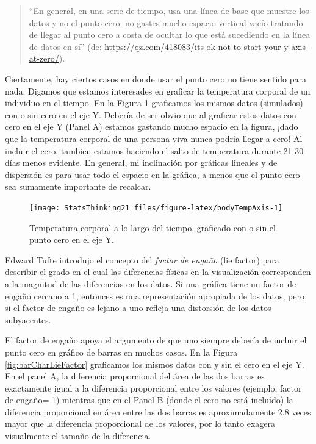 \documentclass[
  12pt,
]{book}
\begin{document}
\begin{quote}
``En general, en una serie de tiempo, usa una línea de base que muestre los datos y no el punto cero; no gastes mucho espacio vertical vacío tratando de llegar al punto cero a costa de ocultar lo que está sucediendo en la línea de datos en sí'' (de: \url{https://qz.com/418083/its-ok-not-to-start-your-y-axis-at-zero/}).
\end{quote}

Ciertamente, hay ciertos casos en donde usar el punto cero no tiene sentido para nada. Digamos que estamos interesades en graficar la temperatura corporal de un individuo en el tiempo. En la Figura \ref{fig:bodyTempAxis} graficamos los mismos datos (simulados) con o sin cero en el eje Y. Debería de ser obvio que al graficar estos datos con cero en el eje Y (Panel A) estamos gastando mucho espacio en la figura, ¡dado que la temperatura corporal de una persona viva nunca podría llegar a cero! Al incluir el cero, tambien estamos haciendo el salto de temperatura durante 21-30 días menos evidente. En general, mi inclinación por gráficas lineales y de dispersión es para usar todo el espacio en la gráfica, a menos que el punto cero sea sumamente importante de recalcar.

\begin{figure}
\texttt{[image: StatsThinking21\_files/figure-latex/bodyTempAxis-1]} \caption{Temperatura corporal a lo largo del tiempo, graficado con o sin el punto cero en el eje Y.}\label{fig:bodyTempAxis}
\end{figure}

Edward Tufte introdujo el concepto del \emph{factor de engaño} (lie factor) para describir el grado en el cual las diferencias físicas en la visualización corresponden a la magnitud de las diferencias en los datos. Si una gráfica tiene un factor de engaño cercano a 1, entonces es una representación apropiada de los datos, pero si el factor de engaño es lejano a uno refleja una distorsión de los datos subyacentes.

El factor de engaño apoya el argumento de que uno siempre debería de incluir el punto cero en gráfico de barras en muchos casos. En la Figura \ref{fig:barCharLieFactor} graficamos los mismos datos con y sin el cero en el eje Y. En el panel A, la diferencia proporcional del área de las dos barras es exactamente igual a la diferencia proporcional entre los valores (ejemplo, factor de engaño= 1) mientras que en el Panel B (donde el cero no está incluído) la diferencia proporcional en área entre las dos barras es aproximadamente 2.8 veces mayor que la diferencia proporcional de los valores, por lo tanto exagera visualmente el tamaño de la diferencia.
\end{document}
